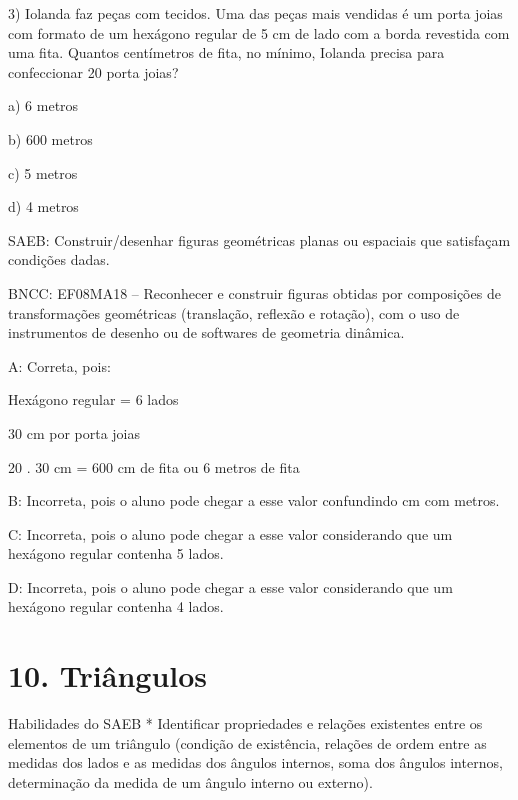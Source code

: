 3) Iolanda faz peças com tecidos. Uma das peças mais vendidas é um porta
joias com formato de um hexágono regular de 5 cm de lado com a borda
revestida com uma fita. Quantos centímetros de fita, no mínimo, Iolanda
precisa para confeccionar 20 porta joias?

a) 6 metros

b) 600 metros

c) 5 metros

d) 4 metros

SAEB: Construir/desenhar figuras geométricas planas ou espaciais que
satisfaçam condições dadas.

BNCC: EF08MA18 -- Reconhecer e construir figuras obtidas por composições
de transformações geométricas (translação, reflexão e rotação), com o
uso de instrumentos de desenho ou de softwares de geometria dinâmica.

A: Correta, pois:

Hexágono regular = 6 lados

30 cm por porta joias

20 . 30 cm = 600 cm de fita ou 6 metros de fita

B: Incorreta, pois o aluno pode chegar a esse valor confundindo cm com
metros.

C: Incorreta, pois o aluno pode chegar a esse valor considerando que um
hexágono regular contenha 5 lados.

D: Incorreta, pois o aluno pode chegar a esse valor considerando que um
hexágono regular contenha 4 lados.

\hypertarget{triuxe2ngulos}{%
\section{10. Triângulos}\label{triuxe2ngulos}}

Habilidades do SAEB * Identificar propriedades e relações existentes
entre os elementos de um triângulo (condição de existência, relações de
ordem entre as medidas dos lados e as medidas dos ângulos internos, soma
dos ângulos internos, determinação da medida de um ângulo interno ou
externo).

